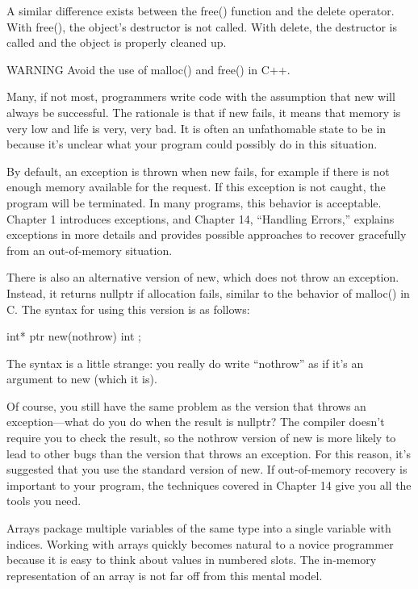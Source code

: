 A similar difference exists between the free() function and the delete operator. With free(), the object’s destructor is not called. With delete, the destructor is called and the object is properly cleaned up.

\begin{myWarning}{WARNING}
Avoid the use of malloc() and free() in C++.
\end{myWarning}


Many, if not most, programmers write code with the assumption that new will always be successful. The rationale is that if new fails, it means that memory is very low and life is very, very bad. It is often an unfathomable state to be in because it’s unclear what your program could possibly do in this situation.

By default, an exception is thrown when new fails, for example if there is not enough memory available for the request. If this exception is not caught, the program will be terminated. In many programs, this behavior is acceptable. Chapter 1 introduces exceptions, and Chapter 14, “Handling Errors,” explains exceptions in more details and provides possible approaches to recover gracefully from an out-of-memory situation.

There is also an alternative version of new, which does not throw an exception. Instead, it returns nullptr if allocation fails, similar to the behavior of malloc() in C. The syntax for using this version is as follows:

\begin{cpp}
int* ptr { new(nothrow) int };
\end{cpp}

The syntax is a little strange: you really do write “nothrow” as if it’s an argument to new (which it is).

Of course, you still have the same problem as the version that throws an exception—what do you do when the result is nullptr? The compiler doesn’t require you to check the result, so the nothrow version of new is more likely to lead to other bugs than the version that throws an exception. For this reason, it’s suggested that you use the standard version of new. If out-of-memory recovery is important to your program, the techniques covered in Chapter 14 give you all the tools you need.


Arrays package multiple variables of the same type into a single variable with indices. Working with arrays quickly becomes natural to a novice programmer because it is easy to think about values in numbered slots. The in-memory representation of an array is not far off from this mental model.

